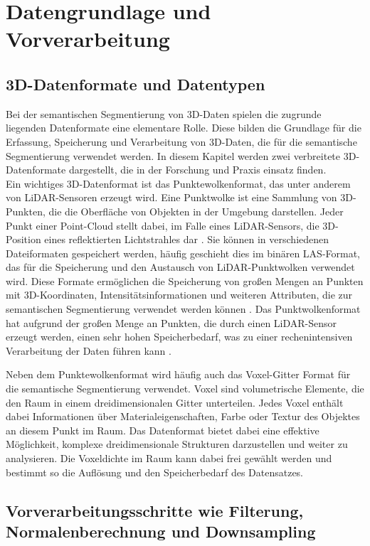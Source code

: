 \chapter{Datengrundlage und Vorverarbeitung}
\section{3D-Datenformate und Datentypen}
Bei der semantischen Segmentierung von 3D-Daten spielen die zugrunde liegenden
Datenformate eine elementare Rolle. Diese bilden die Grundlage für die
Erfassung, Speicherung und Verarbeitung von 3D-Daten, die für die semantische
Segmentierung verwendet werden. In diesem Kapitel werden zwei verbreitete
3D-Datenformate dargestellt, die in der Forschung und Praxis einsatz finden.
\\Ein wichtiges 3D-Datenformat ist das Punktewolkenformat, das unter anderem
von LiDAR-Sensoren erzeugt wird. Eine Punktwolke ist eine Sammlung von
3D-Punkten, die die Oberfläche von Objekten in der Umgebung darstellen. Jeder
Punkt einer Point-Cloud stellt dabei, im Falle eines LiDAR-Sensors, die
3D-Position eines reflektierten Lichtstrahles dar \cite{20222324}. Sie können
in verschiedenen Dateiformaten gespeichert werden, häufig geschieht dies im
binären LAS-Format, das für die Speicherung und den Austausch von
LiDAR-Punktwolken verwendet wird. Diese Formate ermöglichen die Speicherung von
großen Mengen an Punkten mit 3D-Koordinaten, Intensitätsinformationen und
weiteren Attributen, die zur semantischen Segmentierung verwendet werden können
\cite{elphcik1991using}. Das Punktwolkenformat hat aufgrund der großen Menge an
Punkten, die durch einen LiDAR-Sensor erzeugt werden, einen sehr hohen
Speicherbedarf, was zu einer rechenintensiven Verarbeitung der Daten führen
kann \cite{8578570}.

Neben dem Punktewolkenformat wird häufig auch das Voxel-Gitter Format für die
semantische Segmentierung verwendet. Voxel sind volumetrische Elemente, die den
Raum in einem dreidimensionalen Gitter unterteilen. Jedes Voxel enthält dabei
Informationen über Materialeigenschaften, Farbe oder Textur des Objektes an
diesem Punkt im Raum. Das Datenformat bietet dabei eine effektive Möglichkeit,
komplexe dreidimensionale Strukturen darzustellen und weiter zu analysieren.
Die Voxeldichte im Raum kann dabei frei gewählt werden und bestimmt so die
Auflösung und den Speicherbedarf des
Datensatzes.\cite{niessner2013real,6706719}

\section{Vorverarbeitungsschritte wie Filterung, Normalenberechnung und Downsampling}

